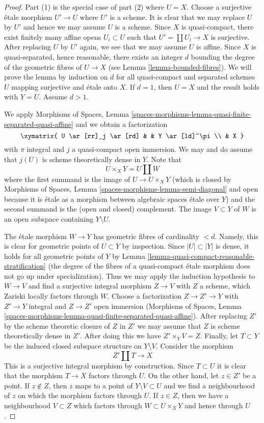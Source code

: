 \begin{proof}
Part (1) is the special case of part (2) where $U = X$.
Choose a surjective \'etale morphism $U' \to U$
where $U'$ is a scheme. It is clear that we may replace $U$ by $U'$
and hence we may assume $U$ is a scheme. Since $X$ is quasi-compact,
there exist finitely many affine opens $U_i \subset U$ such that
$U' = \coprod U_i \to X$ is surjective.
After replacing $U$ by $U'$ again, we see that we may assume $U$ is affine.
Since $X$ is quasi-separated, hence reasonable, there exists an integer
$d$ bounding the degree of the geometric fibres of $U \to X$
(see Lemma \ref{lemma-bounded-fibres}).
We will prove the lemma by induction on $d$ for all quasi-compact
and separated schemes $U$ mapping surjective and \'etale onto $X$.
If $d = 1$, then $U = X$ and the result holds with $Y = U$.
Assume $d > 1$.

\medskip\noindent
We apply Morphisms of Spaces, Lemma
\ref{spaces-morphisms-lemma-quasi-finite-separated-quasi-affine}
and we obtain a factorization
$$
\xymatrix{
U \ar[rr]_j \ar[rd] & & Y \ar[ld]^\pi \\
& X
}
$$
with $\pi$ integral and $j$ a quasi-compact open immersion. We may and do
assume that $j(U)$ is scheme theoretically dense in $Y$. Note that
$$
U \times_X Y = U \amalg W
$$
where the first summand is the image of $U \to U \times_X Y$
(which is closed by
Morphisms of Spaces, Lemma \ref{spaces-morphisms-lemma-semi-diagonal}
and open because it is \'etale as a morphism between
algebraic spaces \'etale over $Y$) and
the second summand is the (open and closed) complement.
The image $V \subset Y$ of $W$ is an open subspace containing
$Y \setminus U$.

\medskip\noindent
The \'etale morphism $W \to Y$ has geometric fibres of cardinality $< d$.
Namely, this is clear for geometric points of $U \subset Y$ by inspection.
Since $|U| \subset |Y|$ is dense, it holds for all geometric points of $Y$
by Lemma \ref{lemma-quasi-compact-reasonable-stratification}
(the degree of the fibres of a quasi-compact \'etale morphism
does not go up under specialization). Thus we may apply the induction
hypothesis to $W \to V$ and find a surjective integral morphism
$Z \to V$ with $Z$ a scheme, which Zariski locally factors through $W$.
Choose a factorization $Z \to Z' \to Y$ with $Z' \to Y$ integral and
$Z \to Z'$ open immersion
(Morphisms of Spaces, Lemma
\ref{spaces-morphisms-lemma-quasi-finite-separated-quasi-affine}).
After replacing $Z'$ by the scheme theoretic closure of $Z$ in $Z'$
we may assume that $Z$ is scheme theoretically dense in $Z'$.
After doing this we have $Z' \times_Y V = Z$. Finally,
let $T \subset Y$ be the induced closed subspace structure on $Y \setminus V$.
Consider the morphism
$$
Z' \amalg T \longrightarrow X
$$
This is a surjective integral morphism by construction.
Since $T \subset U$ it is clear that the morphism $T \to X$
factors through $U$. On the other hand, let $z \in Z'$
be a point. If $z \not \in Z$, then $z$ maps to a point of
$Y \setminus V \subset U$ and we find a neighbourhood of $z$
on which the morphism factors through $U$.
If $z \in Z$, then we have a neighbourhood $V \subset Z$
which factors through $W \subset U \times_X Y$ and hence through $U$.
\end{proof}
